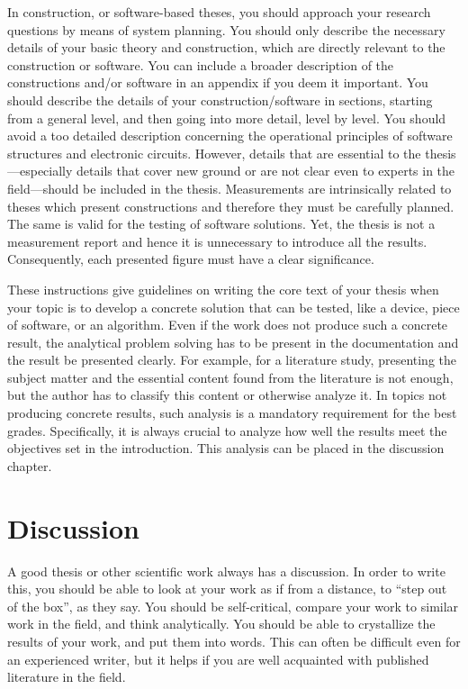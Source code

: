In construction, or software-based theses, you should approach your research questions by means of system planning. You should only describe the necessary details of your basic theory and construction, which are directly relevant to the construction or software. You can include a broader description of the constructions and/or software in an appendix if you deem it important. You should describe the details of your construction/software in sections, starting from a general level, and then going into more detail, level by level. You should avoid a too detailed description concerning the operational principles of software structures and electronic circuits. However, details that are essential to the thesis---especially details that cover new ground or are not clear even to experts in the field---should be included in the thesis.
Measurements are intrinsically related to theses which present constructions and therefore they must be carefully planned. The same is valid for the testing of software solutions. Yet, the thesis is not a measurement report and hence it is unnecessary to introduce all the results. Consequently, each presented figure must have a clear significance.

These instructions give guidelines on writing the core text of your thesis when your topic is to develop a concrete solution that can be tested, like a device, piece of software, or an algorithm. Even if the work does not produce such a concrete result, the analytical problem solving has to be present in the documentation and the result be presented clearly. For example, for a literature study, presenting the subject matter and the essential content found from the literature is not enough, but the author has to classify this content or otherwise analyze it. In topics not producing concrete results, such analysis is a mandatory requirement for the best grades. Specifically, it is always crucial to analyze how well the results meet the objectives set in the introduction. This analysis can be placed in the discussion chapter.

\section{Discussion}

A good thesis or other scientific work always has a discussion. In order to write this, you should be able to look at your work as if from a distance, to \enquote{step out of the box}, as they say. You should be self-critical, compare your work to similar work in the field, and think analytically. You should be able to crystallize the results of your work, and put them into words. This can often be difficult even for an experienced writer, but it helps if you are well acquainted with published literature in the field.

